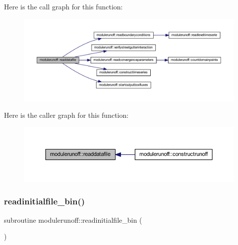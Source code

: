 Here is the call graph for this function\+:
\nopagebreak
\begin{figure}[H]
\begin{center}
\leavevmode
\includegraphics[width=350pt]{namespacemodulerunoff_aa5edc73e0e11d57e48fd2c2b7dd60845_cgraph}
\end{center}
\end{figure}
Here is the caller graph for this function\+:
\nopagebreak
\begin{figure}[H]
\begin{center}
\leavevmode
\includegraphics[width=350pt]{namespacemodulerunoff_aa5edc73e0e11d57e48fd2c2b7dd60845_icgraph}
\end{center}
\end{figure}
\mbox{\label{namespacemodulerunoff_abc7533c7bdb5fde4b69ad3d1db1b0b1a}} 
\subsubsection{\texorpdfstring{readinitialfile\+\_\+bin()}{readinitialfile\_bin()}}
{\footnotesize\ttfamily subroutine modulerunoff\+::readinitialfile\+\_\+bin (\begin{DoxyParamCaption}{ }\end{DoxyParamCaption})\hspace{0.3cm}{\ttfamily [private]}}

